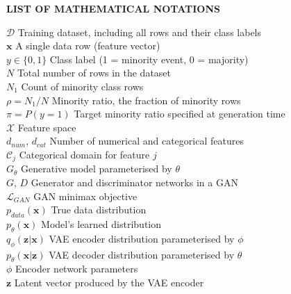 \newpage
\begin{center}
{\LARGE\bf LIST OF MATHEMATICAL NOTATIONS}
\end{center}
\vspace{0.5cm}

\noindent $\mathcal{D}$ \dotfill Training dataset, including all rows and their class labels \\[4pt]
\noindent $\mathbf{x}$ \dotfill A single data row (feature vector) \\[4pt]
\noindent $y \in \{0, 1\}$ \dotfill Class label (1 = minority event, 0 = majority) \\[4pt]
\noindent $N$ \dotfill Total number of rows in the dataset \\[4pt]
\noindent $N_1$ \dotfill Count of minority class rows \\[4pt]
\noindent $\rho = N_1/N$ \dotfill Minority ratio, the fraction of minority rows \\[4pt]
\noindent $\pi = P(y=1)$ \dotfill Target minority ratio specified at generation time \\[4pt]
\noindent $\mathcal{X}$ \dotfill Feature space \\[4pt]
\noindent $d_{num}$, $d_{cat}$ \dotfill Number of numerical and categorical features \\[4pt]
\noindent $\mathcal{C}_j$ \dotfill Categorical domain for feature $j$ \\[4pt]
\noindent $G_\theta$ \dotfill Generative model parameterised by $\theta$ \\[4pt]
\noindent $G$, $D$ \dotfill Generator and discriminator networks in a GAN \\[4pt]
\noindent $\mathcal{L}_{GAN}$ \dotfill GAN minimax objective \\[4pt]
\noindent $p_{data}(\mathbf{x})$ \dotfill True data distribution \\[4pt]
\noindent $p_\theta(\mathbf{x})$ \dotfill Model's learned distribution \\[4pt]
\noindent $q_\phi(\mathbf{z}|\mathbf{x})$ \dotfill VAE encoder distribution parameterised by $\phi$ \\[4pt]
\noindent $p_\theta(\mathbf{x}|\mathbf{z})$ \dotfill VAE decoder distribution parameterised by $\theta$ \\[4pt]
\noindent $\phi$ \dotfill Encoder network parameters \\[4pt]
\noindent $\mathbf{z}$ \dotfill Latent vector produced by the VAE encoder \\[4pt]
